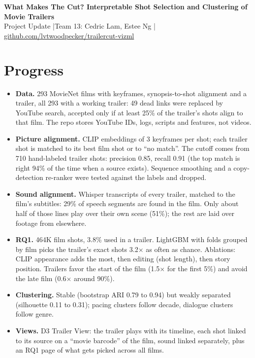 \documentclass[10pt]{article}
\begin{document}
{\large\bfseries What Makes The Cut? Interpretable Shot Selection and Clustering of Movie Trailers}\\[1pt]
Project Update \quad|\quad Team 13: Cedric Lam, Estee Ng \quad|\quad
\href{https://github.com/lvtwoodpecker/trailercut-vizml}{github.com/lvtwoodpecker/trailercut-vizml}

\section{Progress}
\begin{itemize}
\item \textbf{Data.} 293 MovieNet films with keyframes, synopsis-to-shot alignment and a trailer, all 293 with a working trailer: 49 dead links were replaced by YouTube search, accepted only if at least 25\% of the trailer's shots align to that film. The repo stores YouTube IDs, logs, scripts and features, not videos.
\item \textbf{Picture alignment.} CLIP embeddings of 3 keyframes per shot; each trailer shot is matched to its best film shot or to ``no match''. The cutoff comes from 710 hand-labeled trailer shots: precision 0.85, recall 0.91 (the top match is right 94\% of the time when a source exists). Sequence smoothing and a copy-detection re-ranker were tested against the labels and dropped.
\item \textbf{Sound alignment.} Whisper transcripts of every trailer, matched to the film's subtitles: 29\% of speech segments are found in the film. Only about half of those lines play over their own scene (51\%); the rest are laid over footage from elsewhere.
\item \textbf{RQ1.} 464K film shots, 3.8\% used in a trailer. LightGBM with folds grouped by film picks the trailer's exact shots 3.2$\times$ as often as chance. Ablations: CLIP appearance adds the most, then editing (shot length), then story position. Trailers favor the start of the film (1.5$\times$ for the first 5\%) and avoid the late film (0.6$\times$ around 90\%).
\item \textbf{Clustering.} Stable (bootstrap ARI 0.79 to 0.94) but weakly separated (silhouette 0.11 to 0.31); pacing clusters follow decade, dialogue clusters follow genre.
\item \textbf{Views.} D3 Trailer View: the trailer plays with its timeline, each shot linked to its source on a ``movie barcode'' of the film, sound linked separately, plus an RQ1 page of what gets picked across all films.
\end{itemize}
\end{document}
